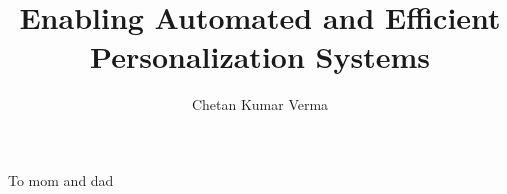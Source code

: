 \documentclass[12pt]{ucsddissertation}
\title{Enabling Automated and Efficient Personalization Systems}
\author{Chetan Kumar Verma}
\newcommand{\comment}[1]{}
\begin{document}
\frontmatter
\maketitle
\makecopyright
\makesignature
\begin{dedication}
\setsinglespacing
\raggedright %
\parindent0pt\parskip\baselineskip
\centering
To mom and dad 
\end{dedication}
\comment{
\begin{epigraph}
\vskip0pt plus.5fil
\setsinglespacing
{\flushright
True ease in writing comes from art, not chance,\\
As those move easiest who have learn'd to dance.\\
'T is not enough to no harshness gives offence,---\\
The sound must seem an echo to the sense.

\vskip\baselineskip
\textit{Alexander Pope}\par}
\vfil
\begin{center}
You write with ease to show your breeding,\\
But easy writing's curst hard reading.

\vskip\baselineskip
\textit{Richard Brinsley Sheridan}
\end{center}
\vfil
\noindent Writing, at its best, is a lonely life. Organizations for
writers palliate the writer's loneliness, but I doubt if they improve
his writing. He grows in public stature as he sheds his loneliness and
often his work deteriorates. For he does his work alone and if he is a
good enough writer he must face eternity, or the lack of it, each day.

\vskip\baselineskip
\hskip0pt plus1fil\textit{Ernest Hemingway}\hskip0pt plus4fil\null

\vfil
\end{epigraph}
}

\tableofcontents
\listoffigures
\listoftables

\comment{
\begin{preface}
Almost nothing is said in the manual about the preface. There is no
indication about how it is to be typeset. Given that, one is forced to
simply typeset it and hope it is accepted. It is, however, optional
and may be omitted.
\end{preface}
}
\end{document}
